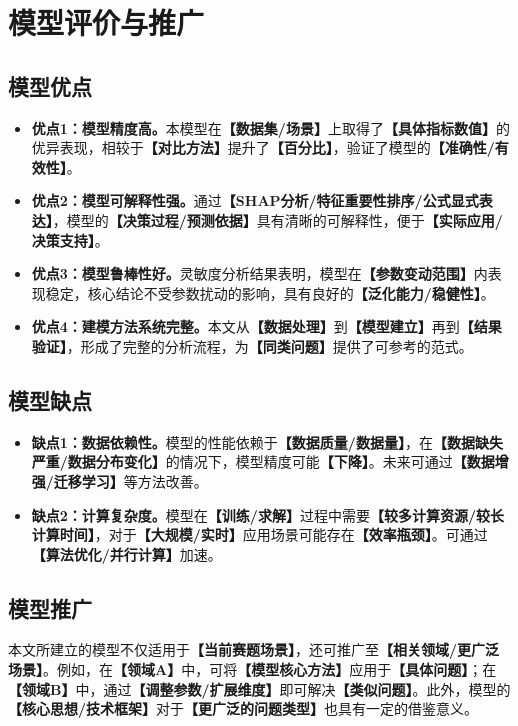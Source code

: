 
\section{模型评价与推广}

\subsection{模型优点}

\begin{itemize}
  \item \textbf{优点1：模型精度高。}本模型在\textbf{【数据集/场景】}上取得了\textbf{【具体指标数值】}的优异表现，相较于\textbf{【对比方法】}提升了\textbf{【百分比】}，验证了模型的\textbf{【准确性/有效性】}。

  \item \textbf{优点2：模型可解释性强。}通过\textbf{【SHAP分析/特征重要性排序/公式显式表达】}，模型的\textbf{【决策过程/预测依据】}具有清晰的可解释性，便于\textbf{【实际应用/决策支持】}。

  \item \textbf{优点3：模型鲁棒性好。}灵敏度分析结果表明，模型在\textbf{【参数变动范围】}内表现稳定，核心结论不受参数扰动的影响，具有良好的\textbf{【泛化能力/稳健性】}。

  \item \textbf{优点4：建模方法系统完整。}本文从\textbf{【数据处理】}到\textbf{【模型建立】}再到\textbf{【结果验证】}，形成了完整的分析流程，为\textbf{【同类问题】}提供了可参考的范式。
\end{itemize}

\subsection{模型缺点}

\begin{itemize}
  \item \textbf{缺点1：数据依赖性。}模型的性能依赖于\textbf{【数据质量/数据量】}，在\textbf{【数据缺失严重/数据分布变化】}的情况下，模型精度可能\textbf{【下降】}。未来可通过\textbf{【数据增强/迁移学习】}等方法改善。

  \item \textbf{缺点2：计算复杂度。}模型在\textbf{【训练/求解】}过程中需要\textbf{【较多计算资源/较长计算时间】}，对于\textbf{【大规模/实时】}应用场景可能存在\textbf{【效率瓶颈】}。可通过\textbf{【算法优化/并行计算】}加速。
\end{itemize}

\subsection{模型推广}

本文所建立的模型不仅适用于\textbf{【当前赛题场景】}，还可推广至\textbf{【相关领域/更广泛场景】}。例如，在\textbf{【领域A】}中，可将\textbf{【模型核心方法】}应用于\textbf{【具体问题】}；在\textbf{【领域B】}中，通过\textbf{【调整参数/扩展维度】}即可解决\textbf{【类似问题】}。此外，模型的\textbf{【核心思想/技术框架】}对于\textbf{【更广泛的问题类型】}也具有一定的借鉴意义。
